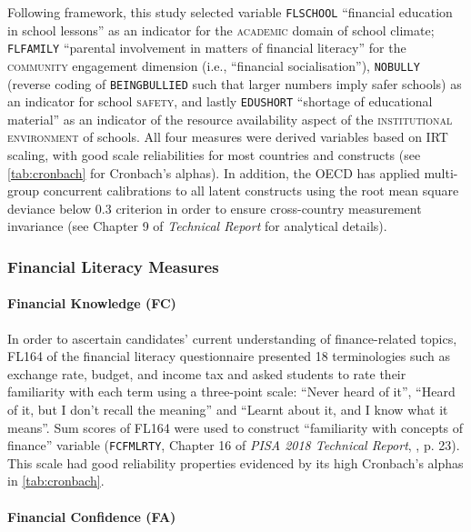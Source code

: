 Following  framework, this study selected variable \texttt{FLSCHOOL} ``financial education in school lessons'' as an indicator for the \textsc{academic} domain of school climate; \texttt{FLFAMILY} ``parental involvement in matters of financial literacy'' for the \textsc{community} engagement dimension (i.e., ``financial socialisation''), \texttt{NOBULLY} (reverse coding of \texttt{BEINGBULLIED} such that larger numbers imply safer schools) as an indicator for school \textsc{safety}, and lastly \texttt{EDUSHORT} ``shortage of educational material'' as an indicator of the resource availability aspect of the \textsc{institutional environment} of schools. All four measures were derived variables based on IRT scaling, with good scale reliabilities for most countries and constructs (see \cref{tab:cronbach} for Cronbach's alphas). In addition, the OECD has applied multi-group concurrent calibrations to all latent constructs using the root mean square deviance below $0.3$ criterion \citep[for a technical discussion on RMSD, see][p. 244]{buchholz:2019} in order to ensure cross-country measurement invariance (see Chapter 9 of \textit{Technical Report} \citep[][pp. 14--15]{PISAtech} for analytical details).

%

\subsubsection{Financial Literacy Measures}

\paragraph{Financial Knowledge (FC)}

In order to ascertain candidates' current understanding of finance-related topics, \textsf{FL164} of the financial literacy questionnaire presented 18 terminologies such as exchange rate, budget, and income tax and asked students to rate their familiarity with each term using a three-point scale: ``Never heard of it'', ``Heard of it, but I don't recall the meaning'' and ``Learnt about it, and I know what it means''. Sum scores of \textsf{FL164} were used to construct ``familiarity with concepts of finance'' variable (\texttt{FCFMLRTY}, Chapter 16 of \textit{PISA 2018 Technical Report}, \citet{PISAtech}, p. 23). This scale had good reliability properties evidenced by its high Cronbach's alphas in \cref{tab:cronbach}.

\paragraph{Financial Confidence (FA)}

